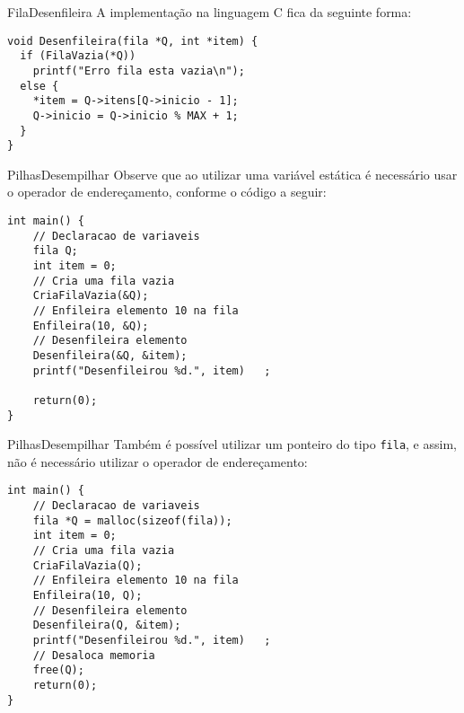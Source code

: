 \documentclass[aspectratio=169]{beamer}
\begin{document}

\begin{frame}[fragile]{Fila}{Desenfileira}
A implementação na linguagem C fica da seguinte forma:

\begin{lstlisting}[style=CStyle]
void Desenfileira(fila *Q, int *item) { 
  if (FilaVazia(*Q))
    printf("Erro fila esta vazia\n");
  else { 
    *item = Q->itens[Q->inicio - 1];
    Q->inicio = Q->inicio % MAX + 1;
  }
} 
\end{lstlisting}  
\end{frame}


\begin{frame}[fragile]{Pilhas}{Desempilhar}
Observe que ao utilizar uma variável estática é necessário usar o operador de endereçamento, conforme o código a seguir:

\begin{lstlisting}[style=CStyle]
int main() { 
    // Declaracao de variaveis
	fila Q; 
	int item = 0;
	// Cria uma fila vazia
	CriaFilaVazia(&Q);
    // Enfileira elemento 10 na fila
	Enfileira(10, &Q);
	// Desenfileira elemento
	Desenfileira(&Q, &item);
	printf("Desenfileirou %d.", item)	;
	
	return(0);
} 
\end{lstlisting}  
\end{frame}


\begin{frame}[fragile]{Pilhas}{Desempilhar}
Também é possível utilizar um ponteiro do tipo \verb|fila|, e assim, não é necessário utilizar o operador de endereçamento:

\begin{lstlisting}[style=CStyle]
int main() { 
    // Declaracao de variaveis
	fila *Q = malloc(sizeof(fila));  
	int item = 0;
	// Cria uma fila vazia
	CriaFilaVazia(Q);
    // Enfileira elemento 10 na fila
	Enfileira(10, Q);
	// Desenfileira elemento
	Desenfileira(Q, &item);
	printf("Desenfileirou %d.", item)	;
	// Desaloca memoria
	free(Q);
	return(0);
} 
\end{lstlisting}  
\end{frame}
\end{document}
